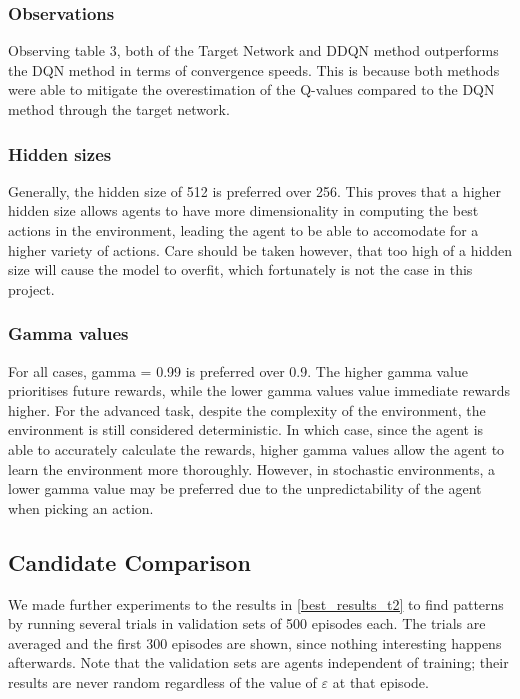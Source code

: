\subsubsection{Observations}
Observing table 3, both of the Target Network and DDQN method outperforms the DQN method in terms of convergence speeds. This is because both methods were able to mitigate the overestimation of the Q-values compared to the DQN method through the target network.

\subsubsection{Hidden sizes}
Generally, the hidden size of 512 is preferred over 256. This proves that a higher hidden size allows agents to have more dimensionality in computing the best actions in the environment, leading the agent to be able to accomodate for a higher variety of actions. Care should be taken however, that too high of a hidden size will cause the model to overfit, which fortunately is not the case in this project.

\subsubsection{Gamma values}
For all cases, gamma = 0.99 is preferred over 0.9. The higher gamma value prioritises future rewards, while the lower gamma values value immediate rewards higher. For the advanced task, despite the complexity of the environment, the environment is still considered deterministic. In which case, since the agent is able to accurately calculate the rewards, higher gamma values allow the agent to learn the environment more thoroughly. However, in stochastic environments, a lower gamma value may be preferred due to the unpredictability of the agent when picking an action.

\subsection{Candidate Comparison}
\label{candidate_comparison}

We made further experiments to the results in \cref{best_results_t2} to find patterns by running several trials in validation sets of 500 episodes each.
The trials are averaged and the first 300 episodes are shown, since nothing interesting happens afterwards.
Note that the validation sets are agents independent of training; their results are never random regardless of the value of $\varepsilon$ at that episode.


